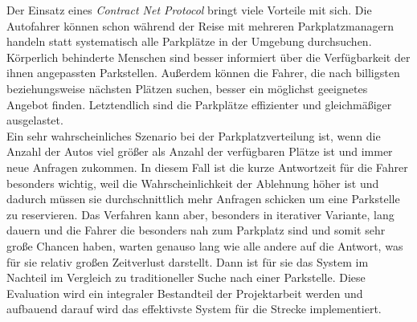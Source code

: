 Der Einsatz eines \textit{Contract Net Protocol} bringt viele Vorteile mit sich. Die Autofahrer können schon während der Reise mit mehreren Parkplatzmanagern handeln statt systematisch alle Parkplätze in der Umgebung durchsuchen. Körperlich behinderte Menschen sind besser informiert über die Verfügbarkeit der ihnen angepassten Parkstellen. Außerdem können die Fahrer, die nach billigsten beziehungsweise nächsten Plätzen suchen, besser ein möglichst geeignetes Angebot finden. Letztendlich sind die Parkplätze effizienter und gleichmäßiger ausgelastet.\\

Ein sehr wahrscheinliches Szenario bei der Parkplatzverteilung ist, wenn die Anzahl der Autos viel größer als Anzahl der verfügbaren Plätze ist und immer neue Anfragen zukommen. In diesem Fall ist die kurze Antwortzeit für die Fahrer besonders wichtig, weil die Wahrscheinlichkeit der Ablehnung höher ist und dadurch müssen sie durchschnittlich mehr Anfragen schicken um eine Parkstelle zu reservieren. Das Verfahren kann aber, besonders in iterativer Variante, lang dauern und die Fahrer die besonders nah zum Parkplatz sind und somit sehr große Chancen haben, warten genauso lang wie alle andere auf die Antwort, was für sie relativ großen Zeitverlust darstellt. Dann ist für sie das System im Nachteil im Vergleich zu traditioneller Suche nach einer Parkstelle. Diese Evaluation wird ein integraler Bestandteil der Projektarbeit werden und aufbauend darauf wird das effektivste System für die Strecke implementiert.



